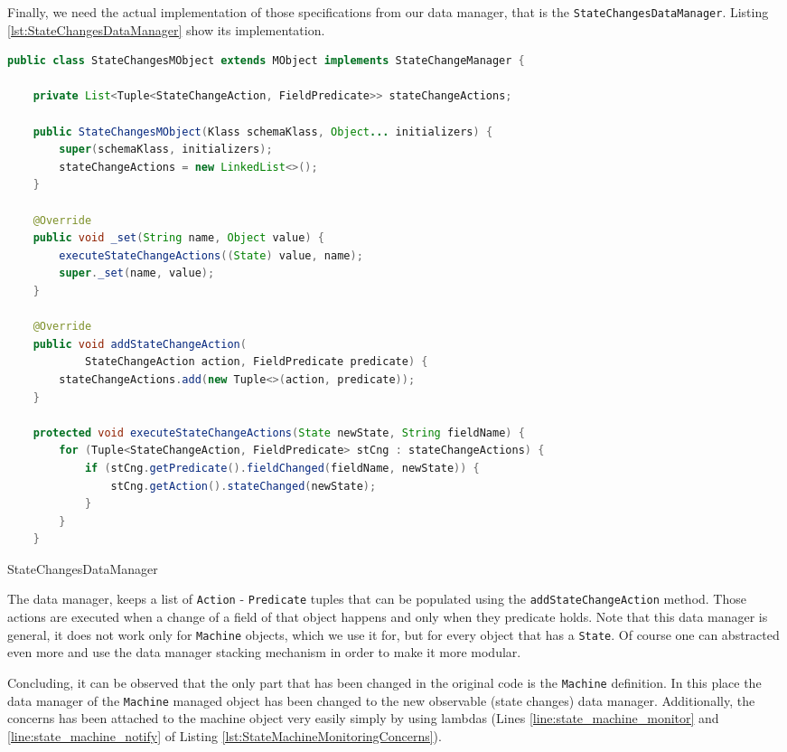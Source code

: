 Finally, we need the actual implementation of those specifications from our data manager, that is the \texttt{StateChangesDataManager}. Listing \ref{lst:StateChangesDataManager} show its implementation.

\begin{sourcecode} [H]
	\begin{lstlisting}[language=Java, escapechar=|]
public class StateChangesMObject extends MObject implements StateChangeManager {

	private List<Tuple<StateChangeAction, FieldPredicate>> stateChangeActions;

	public StateChangesMObject(Klass schemaKlass, Object... initializers) {
		super(schemaKlass, initializers);
		stateChangeActions = new LinkedList<>();
	}

	@Override
	public void _set(String name, Object value) {
		executeStateChangeActions((State) value, name);
		super._set(name, value);
	}

	@Override
	public void addStateChangeAction(
			StateChangeAction action, FieldPredicate predicate) {
		stateChangeActions.add(new Tuple<>(action, predicate));
	}

	protected void executeStateChangeActions(State newState, String fieldName) {
		for (Tuple<StateChangeAction, FieldPredicate> stCng : stateChangeActions) {
			if (stCng.getPredicate().fieldChanged(fieldName, newState)) {
				stCng.getAction().stateChanged(newState);
			}
		}
	}
	\end{lstlisting}
	\caption{StateChangesDataManager}
	\label{lst:StateChangesDataManager}
\end{sourcecode} 

The data manager, keeps a list of \texttt{Action} - \texttt{Predicate} tuples that can be populated using the \texttt{addStateChangeAction} method.
Those actions are executed when a change of a field of that object happens and only when they predicate holds.
Note that this data manager is general, it does not work only for \texttt{Machine} objects, which we use it for, but for every object that has a \texttt{State}.
Of course one can abstracted even more and use the data manager stacking mechanism in order to make it more modular.

Concluding, it can be observed that the only part that has been changed in the original code is the \texttt{Machine} definition.
In this place the data manager of the \texttt{Machine} managed object has been changed to the new observable (state changes) data manager.
Additionally, the concerns has been attached to the machine object very easily simply by using lambdas (Lines \ref{line:state_machine_monitor} and \ref{line:state_machine_notify} of Listing \ref{lst:StateMachineMonitoringConcerns}).

